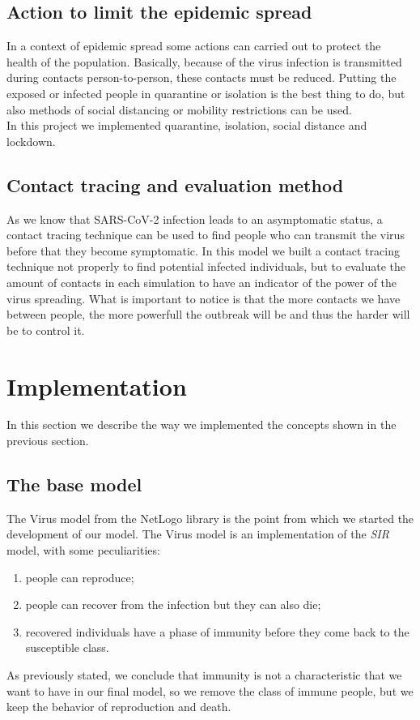 \documentclass[12pt]{llncs}
\begin{document}
\subsection{Action to limit the epidemic spread}
In a context of epidemic spread some actions can carried out to protect the health of the population. Basically, because of the virus infection is transmitted during contacts person-to-person, these contacts must be reduced. Putting the exposed or infected people in quarantine or isolation is the best thing to do, but also methods of social distancing or mobility restrictions can be used. \\
In this project we implemented quarantine, isolation, social distance and lockdown.

\subsection{Contact tracing and evaluation method}
As we know that SARS-CoV-2 infection leads to an asymptomatic status, a contact tracing technique can be used to find people who can transmit the virus before that they become symptomatic. In this model we built a contact tracing technique not properly to find potential infected individuals, but to evaluate the amount of contacts in each simulation to have an indicator of the power of the virus spreading. What is important to notice is that the more contacts we have between people, the more powerfull the outbreak will be and thus the harder will be to control it.

\section{Implementation}
In this section we describe the way we implemented the concepts shown in the previous section.

\subsection{The base model}
The Virus model from the NetLogo library is the point from which we started the development of our model. The Virus model is an implementation of the \textit{SIR} model, with some peculiarities:
\begin{enumerate}
\item people can reproduce;
\item people can recover from the infection but they can also die;
\item recovered individuals have a phase of immunity before they come back to the susceptible class.
\end{enumerate}
As previously stated, we conclude that immunity is not a characteristic that we want to have in our final model, so we remove the class of immune people, but we keep the behavior of reproduction and death.
\end{document}
